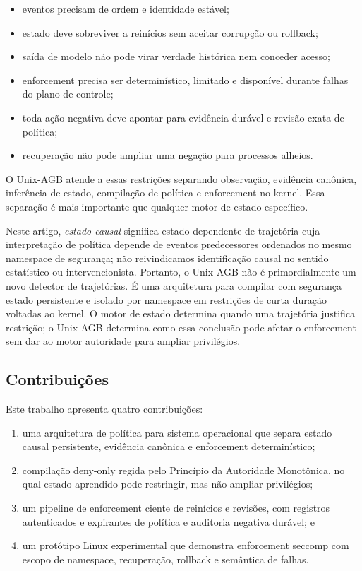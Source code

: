 \documentclass[11pt,a4paper]{article}
\begin{document}
\begin{itemize}[leftmargin=*]
  \item eventos precisam de ordem e identidade estável;
  \item estado deve sobreviver a reinícios sem aceitar corrupção ou rollback;
  \item saída de modelo não pode virar verdade histórica nem conceder acesso;
  \item enforcement precisa ser determinístico, limitado e disponível durante
        falhas do plano de controle;
  \item toda ação negativa deve apontar para evidência durável e revisão exata
        de política;
  \item recuperação não pode ampliar uma negação para processos alheios.
\end{itemize}

O Unix-AGB atende a essas restrições separando observação, evidência canônica,
inferência de estado, compilação de política e enforcement no kernel. Essa
separação é mais importante que qualquer motor de estado específico.

Neste artigo, \emph{estado causal} significa estado dependente de trajetória
cuja interpretação de política depende de eventos predecessores ordenados no
mesmo namespace de segurança; não reivindicamos identificação causal no sentido
estatístico ou intervencionista. Portanto, o Unix-AGB não é primordialmente um
novo detector de trajetórias. É uma arquitetura para compilar com segurança
estado persistente e isolado por namespace em restrições de curta duração
voltadas ao kernel. O motor de estado determina quando uma trajetória justifica
restrição; o Unix-AGB determina como essa conclusão pode afetar o enforcement
sem dar ao motor autoridade para ampliar privilégios.

\subsection*{Contribuições}

Este trabalho apresenta quatro contribuições:

\begin{enumerate}[leftmargin=*]
  \item uma arquitetura de política para sistema operacional que separa estado
        causal persistente, evidência canônica e enforcement determinístico;
  \item compilação deny-only regida pelo Princípio da Autoridade Monotônica, no
        qual estado aprendido pode restringir, mas não ampliar privilégios;
  \item um pipeline de enforcement ciente de reinícios e revisões, com registros
        autenticados e expirantes de política e auditoria negativa durável; e
  \item um protótipo Linux experimental que demonstra enforcement seccomp com
        escopo de namespace, recuperação, rollback e semântica de falhas.
\end{enumerate}
\end{document}
